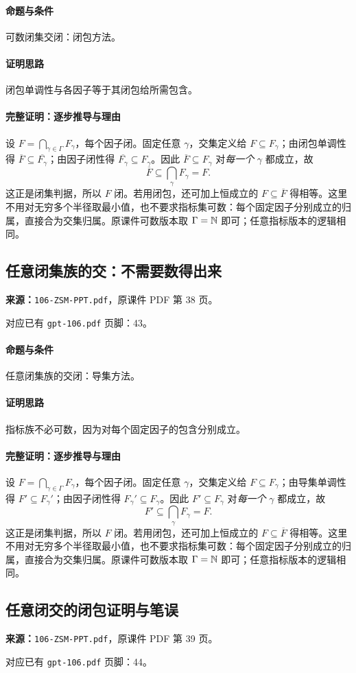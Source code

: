 \paragraph{命题与条件}可数闭集交闭：闭包方法。
\paragraph{证明思路}闭包单调性与各因子等于其闭包给所需包含。
\paragraph{完整证明：逐步推导与理由}
设 $F=\bigcap_{\gamma\in\Gamma}F_\gamma$，每个因子闭。固定任意 $\gamma$，交集定义给 $F\subseteq F_\gamma$；由闭包单调性得 $\overline F\subseteq \overline{F_\gamma}$；由因子闭性得 $\overline{F_\gamma}\subseteq F_\gamma$。因此 $\overline F\subseteq F_\gamma$ 对\emph{每一个} $\gamma$ 都成立，故
\[\overline F\subseteq\bigcap_\gamma F_\gamma=F.\]
这正是闭集判据，所以 $F$ 闭。若用闭包，还可加上恒成立的 $F\subseteq\overline F$ 得相等。这里不用对无穷多个半径取最小值，也不要求指标集可数：每个固定因子分别成立的归属，直接合为交集归属。原课件可数版本取 $\Gamma=\mathbb{N}$ 即可；任意指标版本的逻辑相同。
\clearpage\subsection{任意闭集族的交：不需要数得出来}
\textbf{来源：}\texttt{106-ZSM-PPT.pdf}，原课件 PDF 第 38 页。\par
对应已有 \texttt{gpt-106.pdf} 页脚：43。\par
\paragraph{命题与条件}任意闭集族的交闭：导集方法。
\paragraph{证明思路}指标族不必可数，因为对每个固定因子的包含分别成立。
\paragraph{完整证明：逐步推导与理由}
设 $F=\bigcap_{\gamma\in\Gamma}F_\gamma$，每个因子闭。固定任意 $\gamma$，交集定义给 $F\subseteq F_\gamma$；由导集单调性得 $F'\subseteq F_\gamma'$；由因子闭性得 $F_\gamma'\subseteq F_\gamma$。因此 $F'\subseteq F_\gamma$ 对\emph{每一个} $\gamma$ 都成立，故
\[F'\subseteq\bigcap_\gamma F_\gamma=F.\]
这正是闭集判据，所以 $F$ 闭。若用闭包，还可加上恒成立的 $F\subseteq\overline F$ 得相等。这里不用对无穷多个半径取最小值，也不要求指标集可数：每个固定因子分别成立的归属，直接合为交集归属。原课件可数版本取 $\Gamma=\mathbb{N}$ 即可；任意指标版本的逻辑相同。
\clearpage\subsection{任意闭交的闭包证明与笔误}
\textbf{来源：}\texttt{106-ZSM-PPT.pdf}，原课件 PDF 第 39 页。\par
对应已有 \texttt{gpt-106.pdf} 页脚：44。\par
